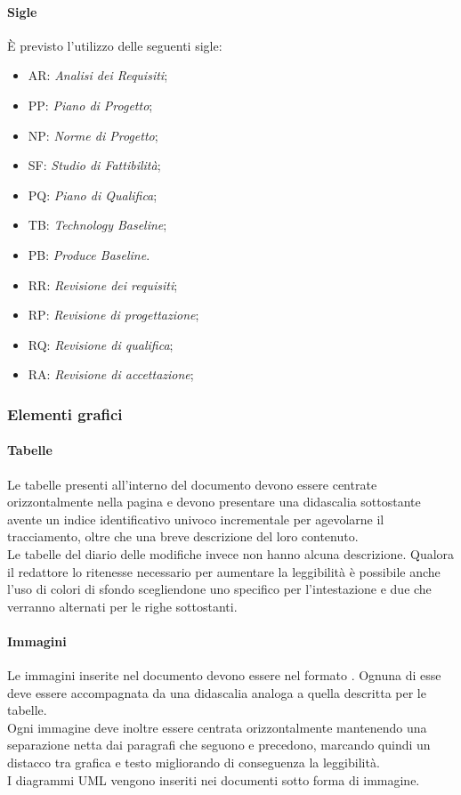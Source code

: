 		\paragraph{Sigle} \Spazio
		È previsto l’utilizzo delle seguenti sigle:
		\begin{itemize}
			\item AR: \textit{Analisi dei Requisiti};
			\item PP: \textit{Piano di Progetto};
			\item NP: \textit{Norme di Progetto};
			\item SF: \textit{Studio di Fattibilità};
			\item PQ: \textit{Piano di Qualifica};
			\item TB: \emph{Technology Baseline};
			\item PB: \emph{Produce Baseline}.
			\item RR: \emph{Revisione dei requisiti};
			\item RP: \emph{Revisione di progettazione};
			\item RQ: \emph{Revisione di qualifica};
			\item RA: \emph{Revisione di accettazione};
		\end{itemize}
		
	\subsubsection{Elementi grafici}
		\paragraph{Tabelle}\Spazio
		Le tabelle presenti all'interno del documento devono essere centrate orizzontalmente nella pagina e devono presentare una didascalia sottostante avente un indice identificativo univoco incrementale per agevolarne il tracciamento, oltre che una breve descrizione del loro contenuto.\\
		Le tabelle del diario delle modifiche invece non hanno alcuna descrizione.
Qualora il redattore lo ritenesse necessario per aumentare la leggibilità è possibile anche l'uso di colori di sfondo scegliendone uno specifico per l'intestazione e due che verranno alternati per le righe sottostanti.

		\paragraph{Immagini}\Spazio
		Le immagini inserite nel documento devono essere nel formato . Ognuna di esse deve essere accompagnata da una didascalia analoga a quella descritta per le tabelle. \\
		Ogni immagine deve inoltre essere centrata orizzontalmente mantenendo una separazione netta dai paragrafi che seguono e precedono, marcando quindi un distacco tra grafica e testo migliorando di conseguenza la leggibilità. \\
		I diagrammi UML vengono inseriti nei documenti sotto forma di immagine.
